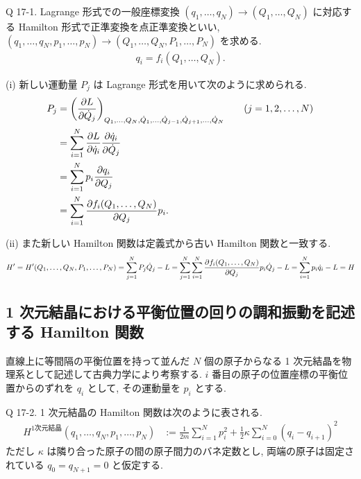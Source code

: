 \documentclass[uplatex,dvipdfmx,a4paper,11pt]{jlreq}
\theoremstyle{definition}
\begin{document}
\begin{itembox}[l]{Q 17-1.}
  Lagrange 形式での一般座標変換 $(q_1,\ldots,q_N)\to(Q_1,\ldots,Q_N)$ に対応する Hamilton 形式で正準変換を点正準変換といい, $(q_1,\ldots,q_N,p_1,\ldots,p_N)\to(Q_1,\ldots,Q_N,P_1,\ldots,P_N)$ を求める.
  \begin{align}
    q_i = f_i(Q_1,\ldots,Q_N).
  \end{align}
\end{itembox}

(i) 新しい運動量 $P_j$ は Lagrange 形式を用いて次のように求められる.
\begin{align}
  P_j & = \qty(\pdv{L}{\dot{Q}_j})_{Q_1,\ldots,Q_N,\dot{Q}_1,\ldots,\dot{Q}_{j-1},\dot{Q}_{j+1},\ldots,\dot{Q}_N} \qquad (j=1,2,\ldots,N) \\
      & = \sum_{i=1}^{N}\pdv{L}{\dot{q}_i}\pdv{\dot{q}_i}{\dot{Q}_j}                                                                      \\
      & = \sum_{i=1}^{N}p_i\pdv{q_i}{Q_j}                                                                                                 \\
      & = \sum_{i=1}^{N}\pdv{f_i(Q_1,\ldots,Q_N)}{Q_j}p_i.
\end{align}

(ii) また新しい Hamilton 関数は定義式から古い Hamilton 関数と一致する.
\begin{align}
  H' = H'(Q_1,\ldots,Q_N,P_1,\ldots,P_N) = \sum_{j=1}^{N}P_j\dot{Q}_j - L = \sum_{j=1}^{N}\sum_{i=1}^{N}\pdv{f_i(Q_1,\ldots,Q_N)}{Q_j}p_i\dot{Q}_j - L = \sum_{i=1}^{N}p_i\dot{q}_i - L = H
\end{align}

\subsection{1 次元結晶における平衡位置の回りの調和振動を記述する Hamilton 関数}
直線上に等間隔の平衡位置を持って並んだ $N$ 個の原子からなる 1 次元結晶を物理系として記述して古典力学により考察する. $i$ 番目の原子の位置座標の平衡位置からのずれを $q_i$ として, その運動量を $p_i$ とする.
\begin{itembox}[l]{Q 17-2.}
  1 次元結晶の Hamilton 関数は次のように表される.
  \begin{align}
    H^{1次元結晶}(q_1,\ldots,q_N, p_1,\ldots,p_N) & := \frac{1}{2m}\sum_{i=1}^{N}p_i^2 + \frac{1}{2}\kappa\sum_{i=0}^{N}(q_i - q_{i+1})^2
  \end{align}
  ただし $\kappa$ は隣り合った原子の間の原子間力のバネ定数とし, 両端の原子は固定されている $q_0 = q_{N+1} = 0$ と仮定する.
\end{itembox}
\end{document}
